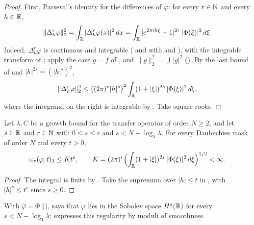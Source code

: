 \begin{proof}
\leanok
{}
First, Parseval's identity for the differences of $\varphi$: for every $r \in \mathbb{N}$ and every
$h \in \mathbb{R}$,
\[
  \|\Delta_h^r \varphi\|_2^2 = \int_{\mathbb{R}} |\Delta_h^r \varphi(x)|^2 \, dx
  = \int_{\mathbb{R}} |e^{2\pi i h \xi} - 1|^{2r} \, |\Phi(\xi)|^2 \, d\xi .
\]
Indeed, $\Delta_h^r \varphi$ is continuous and integrable
( and  with
 and ), with the integrable
transform of ; apply the case $g = f$ of
, and $\|g\|_2^2 = \int |g|^2$ (). By the
last bound of  and $|h|^{2s} = (|h|^s)^2$,
\[
  \|\Delta_h^r \varphi\|_2^2
  \leq \bigl((2\pi)^r |h|^s\bigr)^2 \int_{\mathbb{R}} (1 + |\xi|)^{2s} \, |\Phi(\xi)|^2 \, d\xi ,
\]
where the integrand on the right is integrable by . Take square roots.
\end{proof}

\begin{proposition}
\label{prop:daub-modulus-l2}
\leanok
{}
Let $\lambda, C$ be a growth bound for the transfer operator of order $N \geq 2$, and let
$s \in \mathbb{R}$ and $r \in \mathbb{N}$ with $0 \leq s \leq r$ and $s < N - \log_4 \lambda$. For every
Daubechies mask of order $N$ and every $t > 0$,
\[
  \omega_r(\varphi, t)_2 \leq K t^s , \qquad
  K = (2\pi)^r \Bigl(\int_{\mathbb{R}} (1 + |\xi|)^{2s} \, |\Phi(\xi)|^2 \, d\xi\Bigr)^{1/2} < \infty .
\]
\end{proposition}

\begin{proof}
\leanok
{}
The integral is finite by . Take the supremum over $|h| \leq t$ in
, with $|h|^s \leq t^s$ since $s \geq 0$.
\end{proof}

With $\widehat\varphi = \Phi$ (),  says
that $\varphi$ lies in the Sobolev space $H^s(\mathbb{R})$ for every $s < N - \log_4 \lambda$;
 expresses this regularity by moduli of smoothness.

